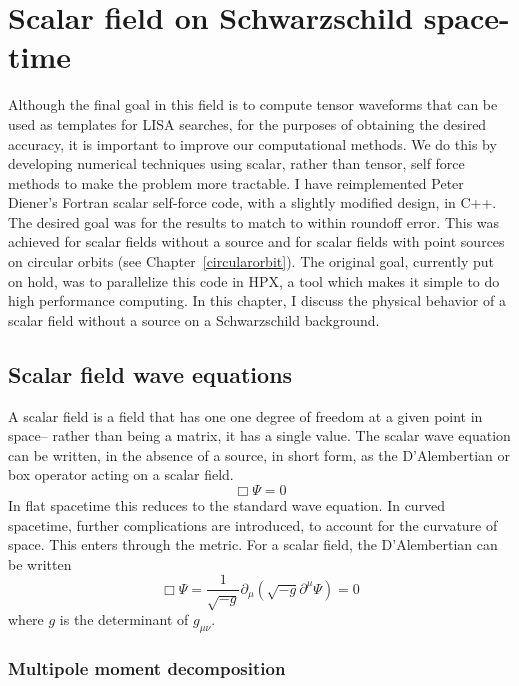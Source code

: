 \section{Scalar field on Schwarzschild space-time}
Although the final goal in this field is to compute tensor waveforms that can be used as templates for LISA searches, for the purposes of obtaining the desired accuracy, it is important to improve our computational methods. We do this by developing numerical techniques using scalar, rather than tensor, self force methods to make the problem more tractable. I have reimplemented Peter Diener's Fortran scalar self-force code, with a slightly modified design, in C++. The desired goal was for the results to match to within roundoff error. This was achieved for scalar fields without a source and for scalar fields with point sources on circular orbits (see Chapter~\ref{circularorbit}). The original goal, currently put on hold, was to parallelize this code in HPX, a tool which makes it simple to do high performance computing. In this chapter, I discuss the physical behavior of a scalar field without a source on a Schwarzschild background. 


\subsection{Scalar field wave equations}
A scalar field is a field that has one one degree of freedom at a given point in space-- rather than being a matrix, it has a single value. The scalar wave equation can be written, in the absence of a source, in short form, as the D'Alembertian or box operator acting on a scalar field. 
\begin{equation}
  \Box\Psi=0
\end{equation}
In flat spacetime this reduces to the standard wave equation. In curved spacetime, further complications are introduced, to account for the curvature of space. This enters through the metric. For a scalar field, the D'Alembertian can be written
\begin{equation}
  \Box\Psi=\frac{1}{\sqrt{-g}}\partial_\mu(\sqrt{-g}\partial^\mu\Psi)=0
\end{equation}
where $g$ is the determinant of $g_{\mu\nu}$.~\cite{Wald} 

\subsubsection{Multipole moment decomposition}

